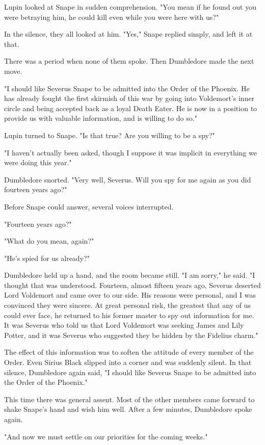Lupin looked at Snape in sudden comprehension. "You mean if he found out you were betraying him, he could kill even while you were here with us?"

In the silence, they all looked at him. "Yes," Snape replied simply, and left it at that.

There was a period when none of them spoke. Then Dumbledore made the next move.

"I should like Severus Snape to be admitted into the Order of the Phoenix. He has already fought the first skirmish of this war by going into Voldemort's inner circle and being accepted back as a loyal Death Eater. He is now in a position to provide us with valuable information, and is willing to do so."

Lupin turned to Snape. "Is that true? Are you willing to be a spy?"

"I haven't actually been asked, though I suppose it was implicit in everything we were doing this year."

Dumbledore snorted. "Very well, Severus. Will you spy for me again as you did fourteen years ago?"

Before Snape could answer, several voices interrupted.

"Fourteen years ago{\el}?"

"What do you mean, again?"

"He's spied for us already?"

Dumbledore held up a hand, and the room became still. "I am sorry," he said. "I thought that was understood. Fourteen, almost fifteen years ago, Severus deserted Lord Voldemort and came over to our side. His reasons were personal, and I was convinced they were sincere. At great personal risk, the greatest that any of us could ever face, he returned to his former master to spy out information for me. It was Severus who told us that Lord Voldemort was seeking James and Lily Potter, and it was Severus who suggested they be hidden by the Fidelius charm."

The effect of this information was to soften the attitude of every member of the Order. Even Sirius Black slipped into a corner and was suddenly silent. In that silence, Dumbledore again said, "I should like Severus Snape to be admitted into the Order of the Phoenix."

This time there was general assent. Most of the other members came forward to shake Snape's hand and wish him well. After a few minutes, Dumbledore spoke again.

"And now we must settle on our priorities for the coming weeks."

